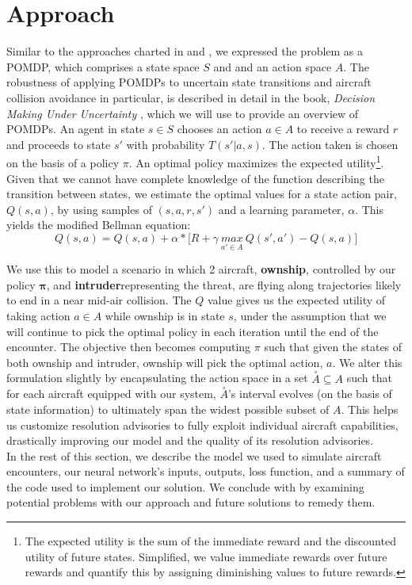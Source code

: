 \documentclass[journal, a4paper]{IEEEtran}
\begin{document}
\section{Approach}
   Similar to the approaches charted in \cite{deeprlcas} and \cite{origpomd}, we expressed the problem as a POMDP, which comprises a state space $S$ and and an action space $A$. The robustness of applying POMDPs to uncertain state transitions and aircraft collision avoidance in particular, is described in detail in the book, \textit{Decision Making Under Uncertainty} \cite{kochbook}, which we will use to provide an overview of POMDPs. An agent in state $s \in S$ chooses an action $a \in A$ to receive a reward $r$ and proceeds to state $s'$ with probability $T(s' | a,s)$. The action taken is chosen on the basis of a policy $\pi$. An optimal policy maximizes the expected utility\footnote{The expected utility is the sum of the immediate reward and the discounted utility of future states. Simplified, we value immediate rewards over future rewards and quantify this by assigning diminishing values to future rewards.}. Given that we cannot have complete knowledge of the function describing the transition between states, we estimate the optimal values for a state action pair, $Q(s, a)$, by using samples of $(s,a,r,s')$ and a learning parameter, $\alpha$. This yields the modified Bellman equation:
    \[Q(s,a) = Q(s,a) + \alpha*\bigl[R + \gamma \: \underset{a' \in A}{max} \: Q(s',a') - Q(s,a)\bigr]\]
    
    We use this to model a scenario in which 2 aircraft, \textbf{ownship}, controlled by our policy $\boldsymbol \pi$, and \textbf{intruder}\textemdash representing the threat, are flying along trajectories likely to end in a near mid-air collision. The $Q$ value gives us the expected utility of taking action $a \in A$ while ownship is in state $s$, under the assumption that we will continue to pick the optimal policy in each iteration until the end of the encounter. The objective then becomes computing $\pi$ such that given the states of both ownship and intruder, ownship will pick the optimal action, $a$. We alter this formulation slightly by encapsulating the action space in a set $\overset{\circ}{A} \subseteq A$ such that for each aircraft equipped with our system, $\overset{\circ}{A}$'s interval evolves (on the basis of state information) to ultimately span the widest possible subset of $A$. This helps us customize resolution advisories to fully exploit individual aircraft capabilities, drastically improving our model and the quality of its resolution advisories.
\\In the rest of this section, we describe the model we used to simulate aircraft encounters, our neural network's inputs, outputs, loss function, and a summary of the code used to implement our solution. We conclude with by examining potential problems with our approach and future solutions to remedy them.
\end{document}
